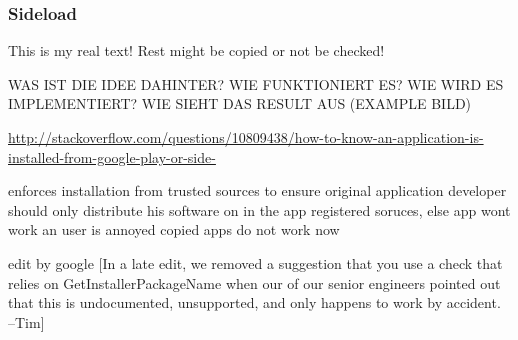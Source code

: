 \subsubsection{Sideload} \label{subsection:counter-improve-tampering-sideload}
This is my real text! Rest might be copied or not be checked!

WAS IST DIE IDEE DAHINTER? WIE FUNKTIONIERT ES? WIE WIRD ES IMPLEMENTIERT? WIE SIEHT DAS RESULT AUS (EXAMPLE BILD)\newline

\url{http://stackoverflow.com/questions/10809438/how-to-know-an-application-is-installed-from-google-play-or-side-}

enforces installation from trusted sources to ensure original application
developer should only distribute his software on in the app registered soruces, else app wont work an user is annoyed
copied apps do not work now




edit by google
[In a late edit, we removed a suggestion that you use a check that relies on GetInstallerPackageName when our of our senior engineers pointed out that this is undocumented, unsupported, and only happens to work by accident. –Tim] \cite{developersSecuring}
